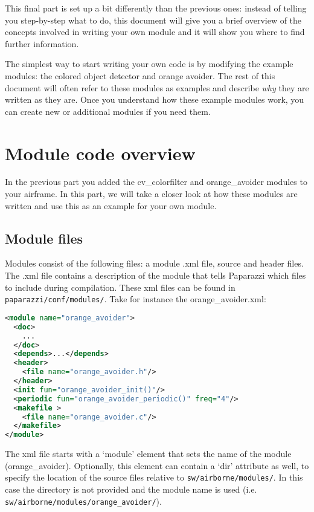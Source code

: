 \documentclass{article}
\begin{document}

This final part is set up a bit differently than the previous ones: instead of telling you step-by-step what to do, this document will give you a brief overview of the concepts involved in writing your own module and it will show you where to find further information.

The simplest way to start writing your own code is by modifying the example modules: the colored object detector and orange avoider. The rest of this document will often refer to these modules as examples and describe \emph{why} they are written as they are. Once you understand how these example modules work, you can create new or additional modules if you need them.

\tableofcontents


\section{Module code overview}
In the previous part you added the cv\_colorfilter and orange\_avoider modules to your airframe.
In this part, we will take a closer look at how these modules are written and use this as an example for your own module.

\subsection{Module files}\label{sec:files}
Modules consist of the following files: a module .xml file, source and header files.  The .xml file contains a description of the module that tells Paparazzi which files to include during compilation. These xml files can be found in \texttt{paparazzi/conf/modules/}. Take for instance the orange\_avoider.xml:
\begin{lstlisting}[language=xml]
<module name="orange_avoider">
  <doc>
    ...
  </doc>
  <depends>...</depends>
  <header>
    <file name="orange_avoider.h"/>
  </header>
  <init fun="orange_avoider_init()"/>
  <periodic fun="orange_avoider_periodic()" freq="4"/>
  <makefile >
    <file name="orange_avoider.c"/>
  </makefile>
</module>
\end{lstlisting}
The xml file starts with a `module' element that sets the name of the module (orange\_avoider). Optionally, this element can contain a `dir' attribute as well, to specify the location of the source files relative to \texttt{sw/airborne/modules/}. In this case the directory is not provided and the module name is used (i.e. \texttt{sw/airborne/modules/orange\_avoider/}).
\end{document}
